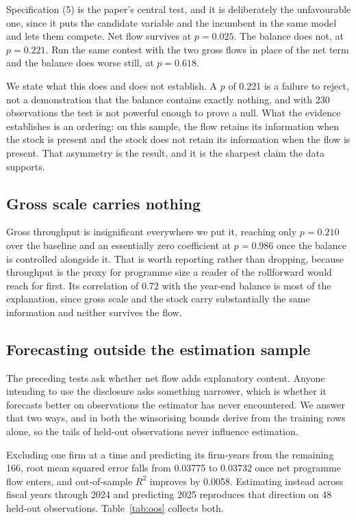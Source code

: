 \documentclass[conference,a4paper]{IEEEtran}
\begin{document}
Specification (5) is the paper's central test, and it is deliberately the
unfavourable one, since it puts the candidate variable and the incumbent in the
same model and lets them compete. Net flow survives at $p = 0.025$. The balance
does not, at $p = 0.221$. Run the same contest with the two gross flows in place
of the net term and the balance does worse still, at $p = 0.618$.

We state what this does and does not establish. A $p$ of 0.221 is a failure to
reject, not a demonstration that the balance contains exactly nothing, and with
230 observations the test is not powerful enough to prove a null. What the
evidence establishes is an ordering: on this sample, the flow retains its
information when the stock is present and the stock does not retain its
information when the flow is present. That asymmetry is the result, and it is
the sharpest claim the data supports.

\subsection{Gross scale carries nothing}

Gross throughput is insignificant everywhere we put it, reaching only
$p = 0.210$ over the baseline and an essentially zero coefficient at
$p = 0.986$ once the balance is controlled alongside it. That is worth reporting
rather than dropping, because throughput is the proxy for programme size a
reader of the rollforward would reach for first. Its correlation of 0.72 with
the year-end balance is most of the explanation, since gross scale and the stock
carry substantially the same information and neither survives the flow.

\subsection{Forecasting outside the estimation sample}

The preceding tests ask whether net flow adds explanatory content. Anyone
intending to use the disclosure asks something narrower, which is whether it
forecasts better on observations the estimator has never encountered. We answer
that two ways, and in both the winsorising bounds derive from the training rows
alone, so the tails of held-out observations never influence estimation.

Excluding one firm at a time and predicting its firm-years from the remaining
166, root mean squared error falls from 0.03775 to 0.03732 once net programme
flow enters, and out-of-sample $R^2$ improves by 0.0058. Estimating instead
across fiscal years through 2024 and predicting 2025 reproduces that direction
on 48 held-out observations. Table~\ref{tab:oos} collects both.
\end{document}
